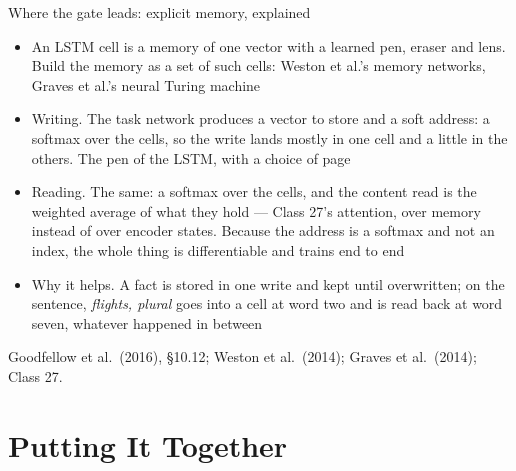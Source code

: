 \documentclass[aspectratio=169, 11pt]{beamer}
\newcommand{\srcline}[1]{%
  \par\vspace{0.25em}%
  {\scriptsize\color{mcMuted}\hfill #1\par}}
\newcommand{\src}[3]{}      %
\begin{document}
\begin{frame}{Where the gate leads: explicit memory, explained}
  \src{goodfellow2016}{section}{10.12}
  \src{graves2014}{section}{3.1}
  \src{graves2014}{section}{3.2}
  \vspace{-0.1em}
  {\footnotesize
  \begin{itemize}\itemsep0.28em
    \item An LSTM cell is a memory of \alert{one} vector with a learned
          pen, eraser and lens. Build the memory as a \alert{set} of such
          cells: Weston et al.'s memory networks, Graves et al.'s neural
          Turing machine
    \item \alert{Writing.} The task network produces a vector to store
          and a soft address: a softmax over the cells, so the write lands
          mostly in one cell and a little in the others. The pen of the
          LSTM, with a choice of page
    \item \alert{Reading.} The same: a softmax over the cells, and the
          content read is the weighted average of what they hold ---
          Class 27's attention, over memory instead of over encoder
          states. Because the address is a softmax and not an index, the
          whole thing is differentiable and trains end to end
    \item \alert{Why it helps.} A fact is stored in one write and kept
          until overwritten; on the sentence, \emph{flights, plural} goes
          into a cell at word two and is read back at word seven, whatever
          happened in between
  \end{itemize}}
  \srcline{Goodfellow et al.\ (2016), \S10.12; Weston et al.\ (2014); Graves et al.\ (2014); Class 27.}
\end{frame}

\section{Putting It Together}
\end{document}

